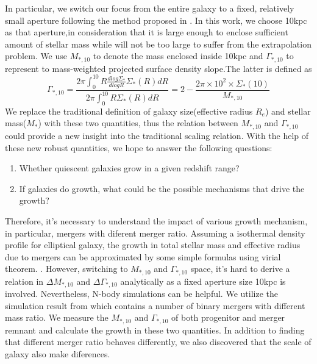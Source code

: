 \documentclass[fleqn,usenatbib]{mnras}
\begin{document}
In particular, we switch our focus from the entire galaxy to a fixed, relatively small aperture following the method proposed in \cite{Alessandro20}. In this work, we choose 10kpc as that aperture,in consideration that it is large enough to enclose sufficient amount of stellar mass while will not be too large to suffer from the extrapolation problem. We use $M_{*,10}$ to denote the mass enclosed inside 10kpc and $\Gamma_{*,10}$ to represent to mass-weighted projected surface density slope.The latter is defined as
\begin{equation}
    \label{eq:gammastar10}
    \Gamma_{*,10} = \frac{2\pi \int_0^{10} R \frac{dlog\Sigma_*}{dlogR}\Sigma_*(R)dR}{2\pi \int_0^{10}R\Sigma_*(R)dR} = 2 - \frac{2\pi \times 10^2 \times \Sigma_*(10)}{M_{*,10}}
\end{equation} 
We replace the traditional definition of galaxy size(effective radius $R_e$) and stellar mass($M_*$) with these two quantities, thus the relation between $M_{*,10}$ and $\Gamma_{*,10}$ could provide a new insight into the traditional scaling relation. With the help of these new robust quantities, we hope to answer the following questions:
\begin{enumerate}[1.]
    \item Whether quiescent galaxies grow in a given redshift range?
    \item If galaxies do growth, what could be the possible mechanisms that drive the growth?
\end{enumerate}
\par Therefore, it's necessary to understand the impact of various growth mechanism, in particular, mergers with diferent merger ratio. Assuming a isothermal density profile for elliptical galaxy, the growth in total stellar mass and effective radius due to mergers can be approximated by some simple formulas using virial theorem\citep{naab_minor_2009}.
 . However, switching to $M_{*,10}$ and $\Gamma_{*,10}$ space, it's hard to derive a relation in $\Delta M_{*,10}$ and $\Delta \Gamma_{*,10}$ analytically as a fixed aperture size 10kpc is involved. Nevertheless, N-body simulations can be helpful. We utilize the simulation result from \cite{nipoti2009} which contains a number of binary mergers with different mass ratio. We measure the $M_{*,10}$ and $\Gamma_{*,10}$ of both progenitor and merger remnant and calculate the growth in these two quantities. In addition to finding that different merger ratio behaves differently, we also discovered that the scale of galaxy also make diferences. 
\end{document}

